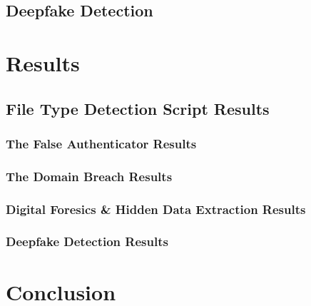 \documentclass[pdflatex,sn-mathphys-num]{sn-jnl}
\begin{document}
\subsection{Deepfake Detection}

\section{Results}\label{results}

\subsection{File Type Detection Script Results}\label{chapter1_results}

\subsubsection{The False Authenticator Results}

\subsubsection{The Domain Breach Results}

\subsubsection{Digital Foresics \& Hidden Data Extraction Results}

\subsubsection{Deepfake Detection Results}

\section{Conclusion}\label{conclusion}



\end{document}
